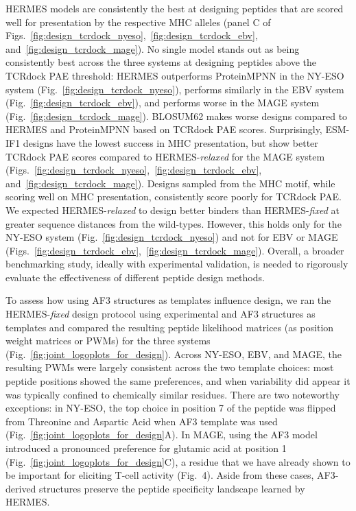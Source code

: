 HERMES models are consistently the best at designing peptides that are scored well for presentation
by the respective MHC alleles (panel C of
Figs.~\ref{fig:design_tcrdock_nyeso},~\ref{fig:design_tcrdock_ebv},
and~\ref{fig:design_tcrdock_mage}). No single model stands out as being consistently best across the
three systems at designing peptides above the TCRdock PAE threshold: HERMES outperforms ProteinMPNN
in the NY-ESO system (Fig.~\ref{fig:design_tcrdock_nyeso}), performs similarly in the EBV system
(Fig.~\ref{fig:design_tcrdock_ebv}), and performs worse in the MAGE system
(Fig.~\ref{fig:design_tcrdock_mage}). BLOSUM62 makes worse designs compared to HERMES and
ProteinMPNN based on TCRdock PAE scores. Surprisingly, ESM-IF1 designs have the lowest success in
MHC presentation, but show better TCRdock PAE scores compared to HERMES-{\em relaxed} for the MAGE
system (Figs.~\ref{fig:design_tcrdock_nyeso},~\ref{fig:design_tcrdock_ebv},
and~\ref{fig:design_tcrdock_mage}). Designs sampled from the MHC motif, while scoring well on MHC
presentation, consistently score poorly for TCRdock PAE. We expected HERMES-{\em relaxed} to design
better binders than HERMES-{\em fixed} at greater sequence distances from the wild-types. However,
this holds only for the NY-ESO system (Fig.~\ref{fig:design_tcrdock_nyeso}) and not for EBV or MAGE
(Figs.~\ref{fig:design_tcrdock_ebv},~\ref{fig:design_tcrdock_mage}). Overall, a broader benchmarking
study, ideally with experimental validation, is needed to rigorously evaluate the effectiveness of
different peptide design methods.

To assess how using AF3 structures as templates influence design, we ran the HERMES-{\em fixed}
design protocol using experimental and AF3 structures as templates and compared the resulting
peptide likelihood matrices (as position weight matrices or PWMs) for the three systems
(Fig.~\ref{fig:joint_logoplots_for_design}). Across NY-ESO, EBV, and MAGE, the resulting PWMs were
largely consistent across the two template choices: most peptide positions showed the same
preferences, and when variability did appear it was typically confined to chemically similar
residues. There are two noteworthy exceptions: in NY-ESO, the top choice in position 7 of the
peptide was flipped from Threonine and Aspartic Acid when AF3 template was used
(Fig.~\ref{fig:joint_logoplots_for_design}A). In MAGE, using the AF3 model introduced a pronounced
preference for glutamic acid at position 1 (Fig.~\ref{fig:joint_logoplots_for_design}C), a residue
that we have already shown to be important for eliciting T-cell activity (Fig.~4). Aside from these
cases, AF3-derived structures preserve the peptide specificity landscape learned by HERMES.


